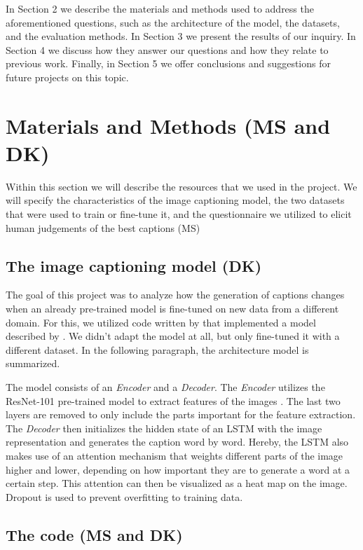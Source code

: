 \documentclass[11pt]{article}
\begin{document}
In Section 2 we describe the materials and methods used to address the aforementioned questions, such as the architecture of the model, the datasets, and the evaluation methods. In Section 3 we present the results of our inquiry. In Section 4 we discuss how they answer our questions and how they relate to previous work. Finally, in Section 5 we offer conclusions and suggestions for future projects on this topic.

\section{Materials and Methods (MS and DK)}

Within this section we will describe the resources that we used in the project. We will specify the characteristics of the image captioning model, the two datasets that were used to train or fine-tune it, and the questionnaire we utilized to elicit human judgements of the best captions (MS)

\subsection{The image captioning model (DK)}

The goal of this project was to analyze how the generation of captions changes when an already pre-trained model is fine-tuned on new data from a different domain. For this, we utilized code written by \cite{ilinykh} that implemented a model described by \cite{xu2015attend}. We didn't adapt the model at all, but only fine-tuned it with a different dataset. In the following paragraph, the architecture model is summarized.

The model consists of an \emph{Encoder} and a \emph{Decoder}. The \emph{Encoder} utilizes the ResNet-101 pre-trained model to extract features of the images \cite{resnet}. The last two layers are removed to only include the parts important for the feature extraction. The \emph{Decoder} then initializes the hidden state of an LSTM with the image representation and generates the caption word by word. Hereby, the LSTM also makes use of an attention mechanism that weights different parts of the image higher and lower, depending on how important they are to generate a word at a certain step. This attention can then be visualized as a heat map on the image. Dropout is used to prevent overfitting to training data.

\subsection{The code (MS and DK)}
\end{document}
